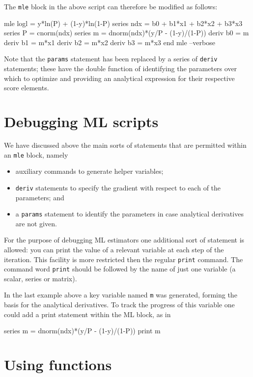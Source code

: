 The \texttt{mle} block in the above script can therefore be modified
as follows:
%
\begin{code}
mle logl = y*ln(P) + (1-y)*ln(1-P)
  series ndx = b0 + b1*x1 + b2*x2 + b3*x3
  series P = cnorm(ndx)
  series m = dnorm(ndx)*(y/P - (1-y)/(1-P))
  deriv b0 = m
  deriv b1 = m*x1
  deriv b2 = m*x2
  deriv b3 = m*x3
end mle --verbose
\end{code}

Note that the \texttt{params} statement has been replaced by a series
of \texttt{deriv} statements; these have the double function of
identifying the parameters over which to optimize and providing an
analytical expression for their respective score elements.

\section{Debugging ML scripts}
\label{sec:mle-debug}

We have discussed above the main sorts of statements that are
permitted within an \texttt{mle} block, namely 
%
\begin{itemize}
\item auxiliary commands to generate helper variables;
\item \texttt{deriv} statements to specify the gradient with respect
  to each of the parameters; and
\item a \texttt{params} statement to identify the parameters in case
  analytical derivatives are not given.
\end{itemize}

For the purpose of debugging ML estimators one additional sort of
statement is allowed: you can print the value of a relevant variable
at each step of the iteration.  This facility is more restricted then
the regular \texttt{print} command.  The command word \texttt{print}
should be followed by the name of just one variable (a scalar, series
or matrix).

In the last example above a key variable named \texttt{m} was
generated, forming the basis for the analytical derivatives.  To track
the progress of this variable one could add a print statement within
the ML block, as in
%
\begin{code}
series m = dnorm(ndx)*(y/P - (1-y)/(1-P))
print m
\end{code}

\section{Using functions}
\label{sec:mle-func}

